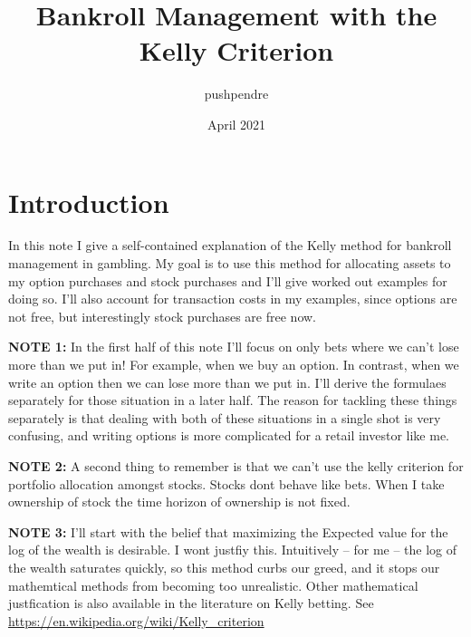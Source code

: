 \documentclass{article}
\title{Bankroll Management with the Kelly Criterion}
\author{pushpendre}
\date{April 2021}
\begin{document}
\maketitle

\section{Introduction}
In this note I give a self-contained explanation of the Kelly method for bankroll management in gambling. My goal is to use this method for allocating assets to my option purchases and stock purchases and I'll give worked out examples for doing so. I'll also account for transaction costs in my examples, since options are not free, but interestingly stock purchases are free now.


\textbf{NOTE 1:} In the first half of this note I'll focus on only bets where we can't lose more than we put in! For example, when we buy an option. In contrast, when we write an option then we can lose more than we put in. I'll derive the formulaes separately for those situation in a later half. The reason for tackling these things separately is that dealing with both of these situations in a single shot is very confusing, and writing options is more complicated for a retail investor like me. 

\textbf{NOTE 2:} A second thing to remember is that we can't use the kelly criterion for portfolio allocation amongst stocks. Stocks dont behave like bets. When I take ownership of stock the time horizon of ownership is not fixed.

\textbf{NOTE 3:} I'll start with the belief that maximizing the Expected value for the log of the wealth is desirable. I wont justfiy this. Intuitively -- for me -- the log of the wealth saturates quickly, so this method curbs our greed, and it stops our mathemtical methods from becoming too unrealistic. Other mathematical justfication is also available in the literature on Kelly betting. See \url{https://en.wikipedia.org/wiki/Kelly_criterion} 
\end{document}
